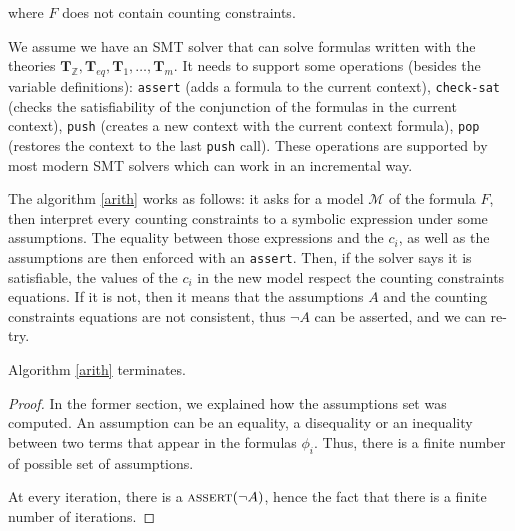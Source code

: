 \documentclass[]{article}
\begin{document}
where $F$ does not contain counting constraints.

We assume we have an SMT solver that can solve formulas written with the
theories
$\mathbf{T}_\mathbb{Z}, \mathbf{T}_{eq}, \mathbf{T}_1, \ldots, \mathbf{T}_m$.
It needs to support some operations (besides the variable definitions):
\texttt{assert} (adds a formula to the current context),
\texttt{check-sat} (checks the satisfiability of the conjunction of the
formulas in the current context), \texttt{push} (creates a new context
with the current context formula), \texttt{pop} (restores the context to
the last \texttt{push} call). These operations are supported by most
modern SMT solvers which can work in an incremental way.

The algorithm \ref{arith} works as follows: it asks for a model
$\mathcal{M}$ of the formula $F$, then interpret every counting
constraints to a symbolic expression under some assumptions. The
equality between those expressions and the $c_i$, as well as the
assumptions are then enforced with an \texttt{assert}. Then, if the
solver says it is satisfiable, the values of the $c_i$ in the new
model respect the counting constraints equations. If it is not, then it
means that the assumptions $A$ and the counting constraints equations
are not consistent, thus $\lnot A$ can be asserted, and we can re-try.

\vspace{3mm}

\begin{lemma}[Termination]

Algorithm \ref{arith} terminates.

\label{termination}

\end{lemma}

\begin{proof}
In the former section, we explained how the assumptions set was computed. An
assumption can be an equality, a disequality or an inequality between two terms
that appear in the formulas $\phi_i$. Thus, there is a finite number of possible
set of assumptions.

At every iteration, there is a $\text{\textsc{assert}}(\lnot A)$, hence the fact that there is
a finite number of iterations.
\end{proof}

\vspace{3mm}

\begin{lemma}[Correctness]

\label{correctness}

\end{lemma}
\end{document}
